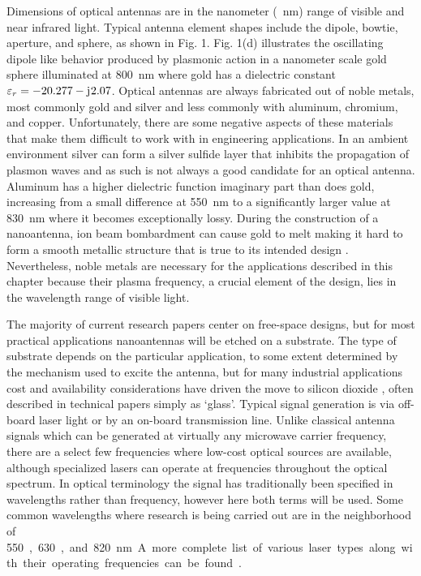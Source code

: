 \documentclass[11pt]{article}
\begin{document}
Dimensions of optical antennas are in the nanometer (\SI{}{\nano\metre}) range of visible and near infrared light. Typical antenna element shapes include the dipole, bowtie, aperture, and sphere, as shown in Fig. 1. Fig. 1(d) illustrates the oscillating dipole like behavior produced by plasmonic action in a nanometer scale gold sphere illuminated at \SI{800}{\nano\metre} where gold has a dielectric constant
$ \varepsilon_r = -20.277 - \mathrm{j}\mkern1mu 2.07$.
Optical antennas are always fabricated out of noble metals, most commonly gold and silver and less commonly with aluminum, chromium, and copper. Unfortunately, there are some negative aspects of these materials that make them difficult to work with in engineering applications. In an ambient environment silver can form a silver sulfide layer that inhibits the propagation of plasmon waves \cite{Nevels2014} and as such is not always a good candidate for an optical antenna. Aluminum has a higher dielectric function imaginary part than does gold, increasing from a small
difference at \SI{550}{\nano\metre} to a significantly larger value at \SI{830}{\nano\metre} where it becomes exceptionally lossy. During the construction of a nanoantenna, ion beam bombardment can cause gold to melt making it hard to form a smooth metallic structure that is true to its intended design \cite{farahani}. Nevertheless, noble metals are necessary for the applications described in this chapter because their plasma frequency, a crucial element of the design, lies in the wavelength range of visible light.




The majority of current research papers center on free-space designs, but for most practical applications nanoantennas will be etched on a substrate. The type of substrate depends on the particular application, to some extent determined by the mechanism used to excite the antenna, but for many industrial applications cost and availability considerations have driven the move to silicon dioxide , often described in technical papers simply as  `glass'. Typical signal generation is via off-board laser light or by an on-board transmission line. Unlike classical antenna signals which can be generated at virtually any microwave carrier frequency, there are a select few frequencies where low-cost optical sources are available, although specialized lasers can operate at frequencies throughout the optical spectrum. In optical terminology the signal has traditionally been specified in wavelengths rather than frequency, however here both terms will be used. Some common wavelengths where research is being carried out are in the neighborhood of
\SI{550}, \SI{630}, and \SI{820}{\nano\metre}. A more complete list of various laser types along with their operating frequencies can be found \cite{Weber2000}.
\end{document}
